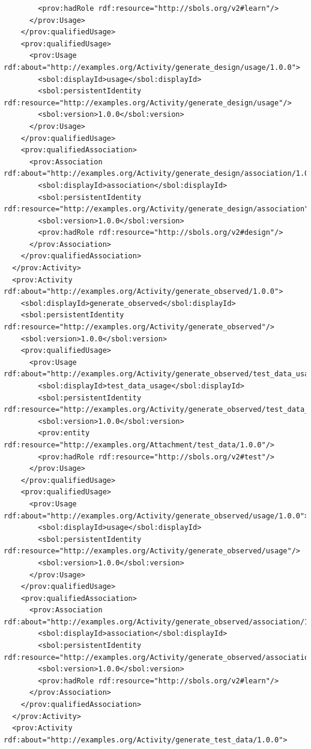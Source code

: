 \begin{lstlisting}
        <prov:hadRole rdf:resource="http://sbols.org/v2#learn"/>
      </prov:Usage>
    </prov:qualifiedUsage>
    <prov:qualifiedUsage>
      <prov:Usage rdf:about="http://examples.org/Activity/generate_design/usage/1.0.0">
        <sbol:displayId>usage</sbol:displayId>
        <sbol:persistentIdentity rdf:resource="http://examples.org/Activity/generate_design/usage"/>
        <sbol:version>1.0.0</sbol:version>
      </prov:Usage>
    </prov:qualifiedUsage>
    <prov:qualifiedAssociation>
      <prov:Association rdf:about="http://examples.org/Activity/generate_design/association/1.0.0">
        <sbol:displayId>association</sbol:displayId>
        <sbol:persistentIdentity rdf:resource="http://examples.org/Activity/generate_design/association"/>
        <sbol:version>1.0.0</sbol:version>
        <prov:hadRole rdf:resource="http://sbols.org/v2#design"/>
      </prov:Association>
    </prov:qualifiedAssociation>
  </prov:Activity>
  <prov:Activity rdf:about="http://examples.org/Activity/generate_observed/1.0.0">
    <sbol:displayId>generate_observed</sbol:displayId>
    <sbol:persistentIdentity rdf:resource="http://examples.org/Activity/generate_observed"/>
    <sbol:version>1.0.0</sbol:version>
    <prov:qualifiedUsage>
      <prov:Usage rdf:about="http://examples.org/Activity/generate_observed/test_data_usage/1.0.0">
        <sbol:displayId>test_data_usage</sbol:displayId>
        <sbol:persistentIdentity rdf:resource="http://examples.org/Activity/generate_observed/test_data_usage"/>
        <sbol:version>1.0.0</sbol:version>
        <prov:entity rdf:resource="http://examples.org/Attachment/test_data/1.0.0"/>
        <prov:hadRole rdf:resource="http://sbols.org/v2#test"/>
      </prov:Usage>
    </prov:qualifiedUsage>
    <prov:qualifiedUsage>
      <prov:Usage rdf:about="http://examples.org/Activity/generate_observed/usage/1.0.0">
        <sbol:displayId>usage</sbol:displayId>
        <sbol:persistentIdentity rdf:resource="http://examples.org/Activity/generate_observed/usage"/>
        <sbol:version>1.0.0</sbol:version>
      </prov:Usage>
    </prov:qualifiedUsage>
    <prov:qualifiedAssociation>
      <prov:Association rdf:about="http://examples.org/Activity/generate_observed/association/1.0.0">
        <sbol:displayId>association</sbol:displayId>
        <sbol:persistentIdentity rdf:resource="http://examples.org/Activity/generate_observed/association"/>
        <sbol:version>1.0.0</sbol:version>
        <prov:hadRole rdf:resource="http://sbols.org/v2#learn"/>
      </prov:Association>
    </prov:qualifiedAssociation>
  </prov:Activity>
  <prov:Activity rdf:about="http://examples.org/Activity/generate_test_data/1.0.0">

\end{lstlisting}
